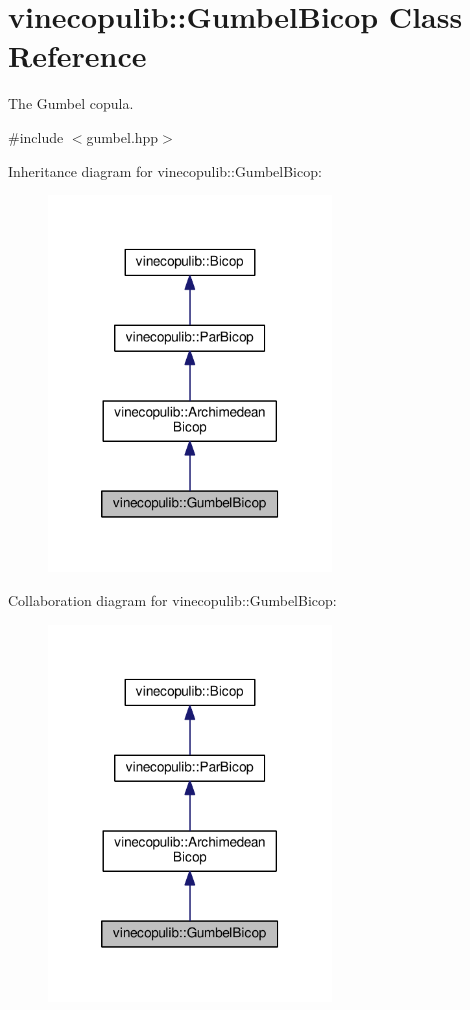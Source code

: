 \hypertarget{classvinecopulib_1_1_gumbel_bicop}{}\section{vinecopulib\+:\+:Gumbel\+Bicop Class Reference}
\label{classvinecopulib_1_1_gumbel_bicop}


The Gumbel copula.  




{\ttfamily \#include $<$gumbel.\+hpp$>$}



Inheritance diagram for vinecopulib\+:\+:Gumbel\+Bicop\+:\nopagebreak
\begin{figure}[H]
\begin{center}
\leavevmode
\includegraphics[width=213pt]{classvinecopulib_1_1_gumbel_bicop__inherit__graph}
\end{center}
\end{figure}


Collaboration diagram for vinecopulib\+:\+:Gumbel\+Bicop\+:\nopagebreak
\begin{figure}[H]
\begin{center}
\leavevmode
\includegraphics[width=213pt]{classvinecopulib_1_1_gumbel_bicop__coll__graph}
\end{center}
\end{figure}
